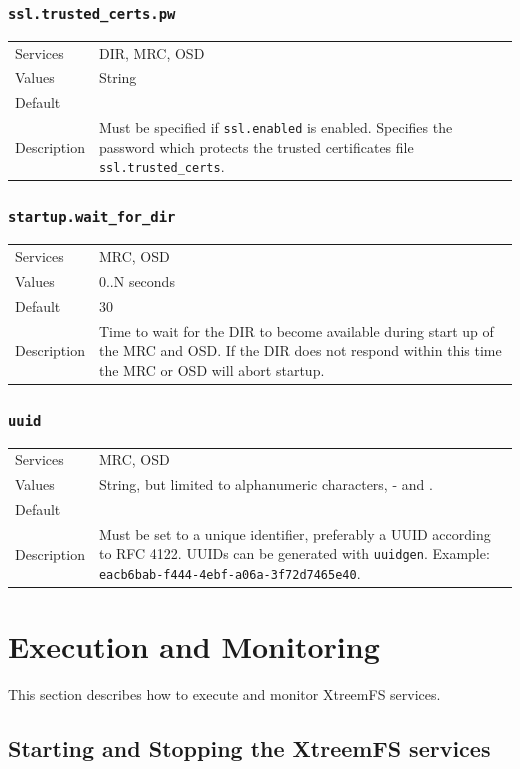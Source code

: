 \documentclass[a4paper,10pt]{book}
\begin{document}
\subsubsection{\texttt{ssl.trusted\_certs.pw}}
\begin{tabular}{lp{10cm}}
 Services & DIR, MRC, OSD\\
 Values   & String\\
 Default  & \\
 Description & Must be specified if \texttt{ssl.enabled} is enabled. Specifies the password which protects the trusted certificates file \texttt{ssl.trusted\_certs}.
\end{tabular}

\subsubsection{\texttt{startup.wait\_for\_dir}}
\begin{tabular}{lp{10cm}}
 Services & MRC, OSD\\
 Values   & 0..N seconds\\
 Default  & 30 \\
 Description & Time to wait for the DIR to become available during start up of the MRC and OSD. If the DIR does not respond within this time the MRC or OSD will abort startup.
\end{tabular}

\subsubsection{\texttt{uuid}}
\begin{tabular}{lp{10cm}}
 Services & MRC, OSD\\
 Values   & String, but limited to alphanumeric characters, - and . \\
 Default  & \\
 Description & Must be set to a unique identifier, preferably a UUID according to RFC 4122. UUIDs can be generated with \texttt{uuidgen}. Example: \texttt{eacb6bab-f444-4ebf-a06a-3f72d7465e40}.
\end{tabular}

\section{Execution and Monitoring}
This section describes how to execute and monitor XtreemFS services.

\subsection{Starting and Stopping the XtreemFS services}
\label{sec:startstopservice}
\end{document}
